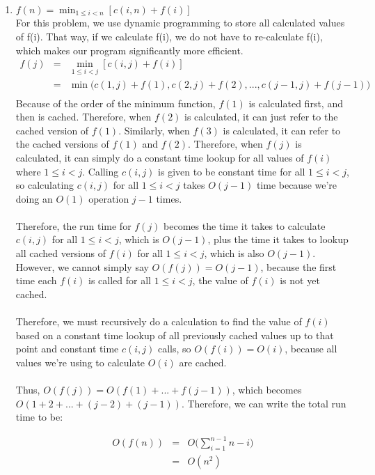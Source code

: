\documentclass[12pt]{article}
\begin{document}
\begin{enumerate}[label=(\alph*)]
  \item $f(n) = \min_{1 \le i < n} [c(i, n) + f(i)]$\\
  For this problem, we use dynamic programming to store all calculated values of f(i). That way, if we calculate f(i), we do not have to re-calculate f(i), which makes our program significantly more efficient.\\
  \begin{eqnarray*}
  f(j) &=& \min_{1 \le i < j} [c(i, j) + f(i)]\\
  &=& \min\biggl(c(1, j) + f(1), c(2, j) + f(2), ..., c(j-1, j) + f(j-1)\biggr)\\
  \end{eqnarray*}
  Because of the order of the minimum function, $f(1)$ is calculated first, and then is cached. Therefore, when $f(2)$ is calculated, it can just refer to the cached version of $f(1)$. Similarly, when $f(3)$ is calculated, it can refer to the cached versions of $f(1)$ and $f(2)$. Therefore, when $f(j)$ is calculated, it can simply do a constant time lookup for all values of $f(i)$ where $1 \le i < j$. Calling $c(i, j)$ is given to be constant time for all $1 \le i < j$, so calculating $c(i, j)$ for all $1 \le i < j$ takes $O(j-1)$ time because we're doing an $O(1)$ operation $j-1$ times. \\
   \\
  Therefore, the run time for $f(j)$ becomes the time it takes to calculate $c(i, j)$ for all $1 \le i < j$, which is $O(j-1)$, plus the time it takes to lookup all cached versions of $f(i)$ for all $1 \le i < j$, which is also $O(j-1)$. However, we cannot simply say $O(f(j)) = O(j-1)$, because the first time each $f(i)$ is called for all $1 \le i < j$, the value of $f(i)$ is not yet cached. \\
   \\
  Therefore, we must recursively do a calculation to find the value of $f(i)$ based on a constant time lookup of all previously cached values up to that point and constant time $c(i, j)$ calls, so $O(f(i)) = O(i)$, because all values we're using to calculate $O(i)$ are cached.\\
   \\
  Thus, $O(f(j)) = O(f(1) + ... + f(j-1))$, which becomes $O(1 + 2 + ... + (j-2) + (j-1))$. Therefore, we can write the total run time to be: 

  \begin{eqnarray*}
  O(f(n)) &=& O\biggl(\displaystyle\sum\limits_{i=1}^{n-1} n-i\biggr)\\
  &=& O(n^2)\\
  \end{eqnarray*}
\end{enumerate}
\end{document}
